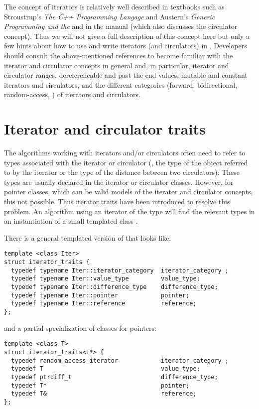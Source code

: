 The concept of iterators is relatively well described in textbooks such as 
Stroustrup's {\em The C++ Programming Langage} \cite{Stroustrup97} 
and Austern's {\em Generic Programming and the \stl} \cite{Austern98}
and in the
 manual (which also
discusses the circulator concept).
Thus we will not give a full description of this concept here
but only a few hints about how to use and write iterators (and circulators)
in \cgal.  Developers should consult the above-mentioned references to become
familiar with the iterator and circulator concepts in general and, in
particular, iterator and circulator ranges, dereferencable and past-the-end 
values, mutable and constant iterators and circulators, and the different 
categories (forward, bidirectional, random-access, \etc) of iterators and 
circulators.


\section{Iterator and circulator traits}
\label{sec:iterator_traits}

The algorithms working with iterators and/or circulators often need to refer
to types associated with the iterator or circulator (\eg,
the type of the object referred to by the iterator
or the type of the distance between two circulators).
These types are usually declared in the iterator or circulator classes. 
However, for pointer classes, which can be valid models of the iterator
and circulator concepts,  this not possible. 
Thus iterator traits have been introduced to resolve this problem.
An algorithm using an iterator of the type  will find the 
relevant types in an instantiation of a small templated class 
.

There is a  general templated version
of  that looks like:
\begin{verbatim}
template <class Iter> 
struct iterator_traits {
  typedef typename Iter::iterator_category  iterator_category ;
  typedef typename Iter::value_type         value_type;
  typedef typename Iter::difference_type    difference_type;
  typedef typename Iter::pointer            pointer;
  typedef typename Iter::reference          reference;
};
\end{verbatim}
and a partial specialization of  classes for pointers:
\begin{verbatim}
template <class T> 
struct iterator_traits<T*> {
  typedef random_access_iterator            iterator_category ;
  typedef T                                 value_type;
  typedef ptrdiff_t                         difference_type;
  typedef T*                                pointer;
  typedef T&                                reference;
};
\end{verbatim}

